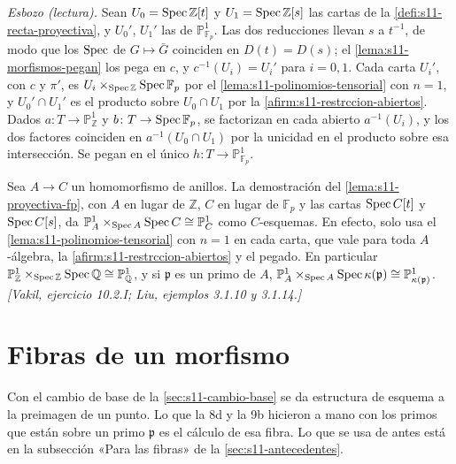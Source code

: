 \emph{Esbozo (lectura).} Sean \(U_0=\operatorname{Spec}\mathbb Z[t]\) y \(U_1=\operatorname{Spec}\mathbb Z[s]\) las cartas de la \cref{defi:s11-recta-proyectiva}, y \(U_0'\), \(U_1'\) las de \(\mathbb P^1_{\mathbb F_p}\). Las dos reducciones llevan \(s\) a \(t^{-1}\), de modo que los \(\operatorname{Spec}\) de \(G\mapsto\bar G\) coinciden en \(D(t)=D(s)\); el \cref{lema:s11-morfismos-pegan} los pega en \(c\), y \(c^{-1}(U_i)=U_i'\) para \(i=0,1\). Cada carta \(U_i'\), con \(c\) y \(\pi'\), es \(U_i\times_{\operatorname{Spec}\mathbb Z}\operatorname{Spec}\mathbb F_p\) por el \cref{lema:s11-polinomios-tensorial} con \(n=1\), y \(U_0'\cap U_1'\) es el producto sobre \(U_0\cap U_1\) por la \cref{afirm:s11-restrccion-abiertos}. Dados \(a\colon T\to\mathbb P^1_{\mathbb Z}\) y \(b\colon T\to\operatorname{Spec}\mathbb F_p\), se factorizan en cada abierto \(a^{-1}(U_i)\), y los dos factores coinciden en \(a^{-1}(U_0\cap U_1)\) por la unicidad en el producto sobre esa intersección. Se pegan en el único \(h\colon T\to\mathbb P^1_{\mathbb F_p}\).

\begin{obs}
\label{obs:s11-cambio-base-proyectiva}
Sea \(A\to C\) un homomorfismo de anillos. La demostración del \cref{lema:s11-proyectiva-fp}, con \(A\) en lugar de \(\mathbb Z\), \(C\) en lugar de \(\mathbb F_p\) y las cartas \(\operatorname{Spec} C[t]\) y \(\operatorname{Spec} C[s]\), da \(\mathbb P^1_A\times_{\operatorname{Spec} A}\operatorname{Spec} C\cong\mathbb P^1_C\) como \(C\)-esquemas. En efecto, solo usa el \cref{lema:s11-polinomios-tensorial} con \(n=1\) en cada carta, que vale para toda \(A\)-álgebra, la \cref{afirm:s11-restrccion-abiertos} y el pegado. En particular \(\mathbb P^1_{\mathbb Z}\times_{\operatorname{Spec}\mathbb Z}\operatorname{Spec}\mathbb Q\cong\mathbb P^1_{\mathbb Q}\), y si \(\mathfrak p\) es un primo de \(A\), \(\mathbb P^1_A\times_{\operatorname{Spec} A}\operatorname{Spec}\kappa(\mathfrak p)\cong\mathbb P^1_{\kappa(\mathfrak p)}\). \emph{[Vakil, ejercicio 10.2.I; Liu, ejemplos 3.1.10 y 3.1.14.]}
\end{obs}

\section{Fibras de un morfismo}
\label{sec:s11-fibras}

Con el cambio de base de la \cref{sec:s11-cambio-base} se da estructura de esquema a la preimagen de un punto. Lo que la 8d y la 9b hicieron a mano con los primos que están sobre un primo \(\mathfrak p\) es el cálculo de esa fibra. Lo que se usa de antes está en la subsección «Para las fibras» de la \cref{sec:s11-antecedentes}.

